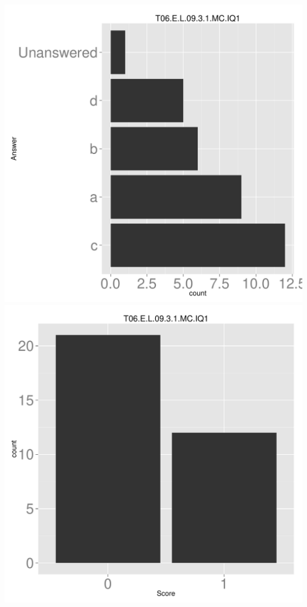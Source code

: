 \documentclass[12pt,nohyper]{tufte-handout}\usepackage[]{graphicx}\usepackage[]{color}
\begin{document}
\begin{center} \includegraphics[width=.45\linewidth]{Topic06_42_answer} \includegraphics[width=.45\linewidth]{Topic06_42_score} \end{center} 
\end{document}
